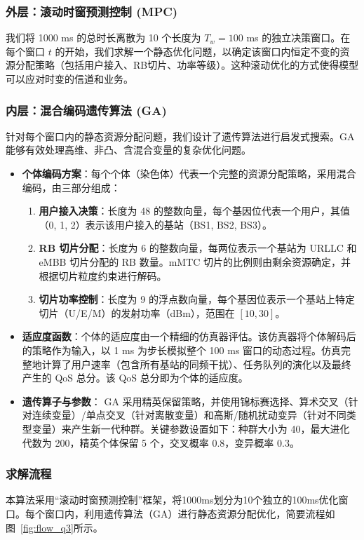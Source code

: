 \subsubsection{外层：滚动时窗预测控制 (MPC)}
我们将 1000 ms 的总时长离散为 10 个长度为 $T_w=100$ ms 的独立决策窗口。在每个窗口 $t$ 的开始，我们求解一个静态优化问题，以确定该窗口内恒定不变的资源分配策略（包括用户接入、RB切片、功率等级）。这种滚动优化的方式使得模型可以应对时变的信道和业务。


\subsubsection{内层：混合编码遗传算法 (GA)}
针对每个窗口内的静态资源分配问题，我们设计了遗传算法进行启发式搜索。GA 能够有效处理高维、非凸、含混合变量的复杂优化问题。
\begin{itemize}
    \item \textbf{个体编码方案}：每个个体（染色体）代表一个完整的资源分配策略，采用混合编码，由三部分组成：
    \begin{enumerate}
        \item \textbf{用户接入决策}：长度为 48 的整数向量，每个基因位代表一个用户，其值（0, 1, 2）表示该用户接入的基站（BS1, BS2, BS3）。
        \item \textbf{RB 切片分配}：长度为 6 的整数向量，每两位表示一个基站为 URLLC 和 eMBB 切片分配的 RB 数量。mMTC 切片的比例则由剩余资源确定，并根据切片粒度约束进行解码。
        \item \textbf{切片功率控制}：长度为 9 的浮点数向量，每个基因位表示一个基站上特定切片（U/E/M）的发射功率（dBm），范围在 $[10, 30]$。
    \end{enumerate}
    \item \textbf{适应度函数}：个体的适应度由一个精细的仿真器评估。该仿真器将个体解码后的策略作为输入，以 1 ms 为步长模拟整个 100 ms 窗口的动态过程。仿真完整地计算了用户速率（包含所有基站的同频干扰）、任务队列的演化以及最终产生的 QoS 总分。该 QoS 总分即为个体的适应度。
    \item \textbf{遗传算子与参数}：
    GA 采用精英保留策略，并使用锦标赛选择、算术交叉（针对连续变量）/单点交叉（针对离散变量）和高斯/随机扰动变异（针对不同类型变量）来产生新一代种群。关键参数设置如下：种群大小为 40，最大进化代数为 200，精英个体保留 5 个，交叉概率 0.8，变异概率 0.3。
\end{itemize}
\subsubsection{求解流程}
本算法采用“滚动时窗预测控制”框架，将1000ms划分为10个独立的100ms优化窗口。每个窗口内，利用遗传算法（GA）进行静态资源分配优化，简要流程如图~\ref{fig:flow_q3}所示。

